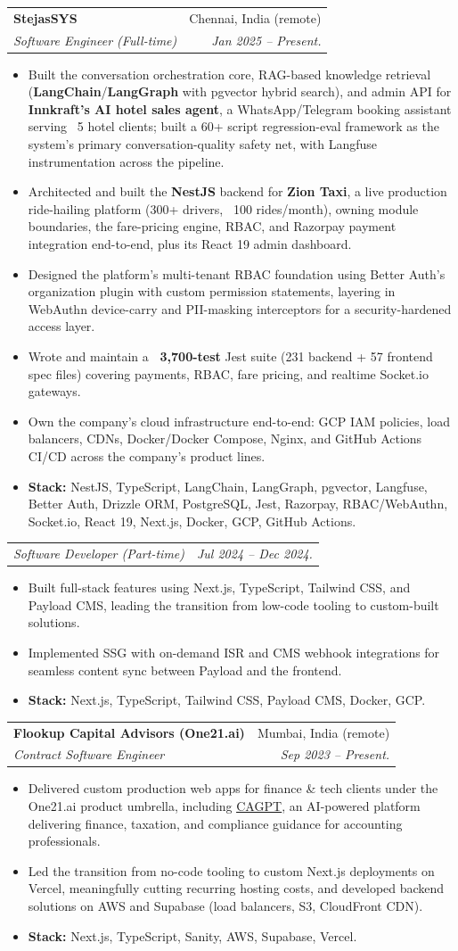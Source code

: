\documentclass[letterpaper,11pt]{article}
\makeatletter
\newcommand{\resumeItem}[1]{
  \item\small{
    {#1 \vspace{-2pt}}
  }
}
\newcommand{\resumeSubheading}[4]{
  \vspace{-2pt}\item
    \begin{tabular*}{0.97\textwidth}[t]{l@{\extracolsep{\fill}}r}
      \textbf{#1} & #2 \\
      \textit{\small#3} & \textit{\small #4} \\
    \end{tabular*}\vspace{-7pt}
}
\newcommand{\resumeSubSubheading}[2]{
    \item
    \begin{tabular*}{0.97\textwidth}{l@{\extracolsep{\fill}}r}
      \textit{\small#1} & \textit{\small #2} \\
    \end{tabular*}\vspace{-7pt}
}
\newcommand{\resumeItemListStart}{\begin{itemize}}
\newcommand{\resumeItemListEnd}{\end{itemize}\vspace{-5pt}}
\makeatother
\begin{document}
    \resumeSubheading
      {StejasSYS}{Chennai, India (remote)}
      {Software Engineer (Full-time)}{Jan 2025 -- Present.}
      \resumeItemListStart
        \resumeItem{Built the conversation orchestration core, RAG-based knowledge retrieval (\textbf{LangChain}/\textbf{LangGraph} with pgvector hybrid search), and admin API for \textbf{Innkraft's AI hotel sales agent}, a WhatsApp/Telegram booking assistant serving ~5 hotel clients; built a 60+ script regression-eval framework as the system's primary conversation-quality safety net, with Langfuse instrumentation across the pipeline.}
        \resumeItem{Architected and built the \textbf{NestJS} backend for \textbf{Zion Taxi}, a live production ride-hailing platform (300+ drivers, ~100 rides/month), owning module boundaries, the fare-pricing engine, RBAC, and Razorpay payment integration end-to-end, plus its React 19 admin dashboard.}
        \resumeItem{Designed the platform's multi-tenant RBAC foundation using Better Auth's organization plugin with custom permission statements, layering in WebAuthn device-carry and PII-masking interceptors for a security-hardened access layer.}
        \resumeItem{Wrote and maintain a \textbf{~3,700-test} Jest suite (231 backend + 57 frontend spec files) covering payments, RBAC, fare pricing, and realtime Socket.io gateways.}
        \resumeItem{Own the company's cloud infrastructure end-to-end: GCP IAM policies, load balancers, CDNs, Docker/Docker Compose, Nginx, and GitHub Actions CI/CD across the company's product lines.}
        \resumeItem{\textbf{Stack:} NestJS, TypeScript, LangChain, LangGraph, pgvector, Langfuse, Better Auth, Drizzle ORM, PostgreSQL, Jest, Razorpay, RBAC/WebAuthn, Socket.io, React 19, Next.js, Docker, GCP, GitHub Actions.}
      \resumeItemListEnd

      \resumeSubSubheading
        {Software Developer (Part-time)}{Jul 2024 -- Dec 2024.}
      \resumeItemListStart
        \resumeItem{Built full-stack features using Next.js, TypeScript, Tailwind CSS, and Payload CMS, leading the transition from low-code tooling to custom-built solutions.}
        \resumeItem{Implemented SSG with on-demand ISR and CMS webhook integrations for seamless content sync between Payload and the frontend.}
        \resumeItem{\textbf{Stack:} Next.js, TypeScript, Tailwind CSS, Payload CMS, Docker, GCP.}
      \resumeItemListEnd

    \resumeSubheading
      {Flookup Capital Advisors (One21.ai)}{Mumbai, India (remote)}
      {Contract Software Engineer}{Sep 2023 -- Present.}
      \resumeItemListStart
        \resumeItem{Delivered custom production web apps for finance \& tech clients under the One21.ai product umbrella, including \href{https://cagpt.in}{\underline{CAGPT}}, an AI-powered platform delivering finance, taxation, and compliance guidance for accounting professionals.}
        \resumeItem{Led the transition from no-code tooling to custom Next.js deployments on Vercel, meaningfully cutting recurring hosting costs, and developed backend solutions on AWS and Supabase (load balancers, S3, CloudFront CDN).}
        \resumeItem{\textbf{Stack:} Next.js, TypeScript, Sanity, AWS, Supabase, Vercel.}
      \resumeItemListEnd
\end{document}
